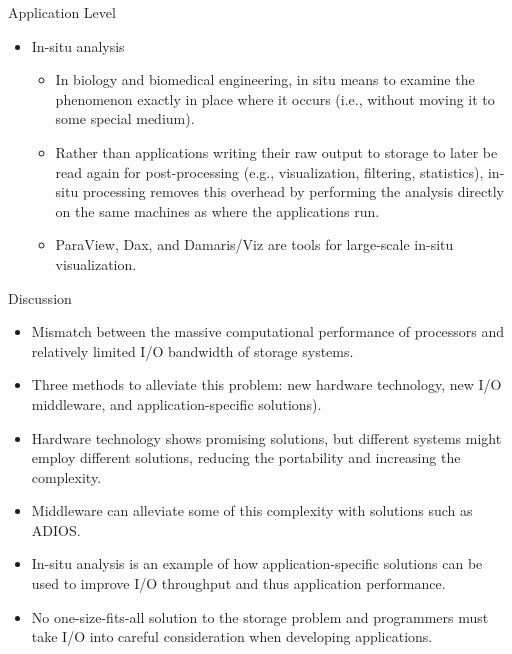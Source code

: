 \documentclass[compress,11pt,xcolor=svgnames,aspectratio=169]{beamer}
\begin{document}
\begin{frame}[t]{Application Level}

\begin{itemize}

\item In-situ analysis\\[0.4cm]

    \begin{itemize}
    \setlength\itemsep{0.6cm}

    \item In biology and biomedical engineering, in situ means to examine the phenomenon exactly in place where it occurs (i.e., without moving it to some special medium).

    \item Rather than applications writing their raw output to storage to later be read again for post-processing (e.g., visualization, filtering, statistics), in-situ processing removes this overhead by performing the analysis directly on the same machines as where the applications run.

    \item ParaView, Dax, and Damaris/Viz are tools for large-scale in-situ visualization.

    \end{itemize}

\end{itemize}

\end{frame}

\begin{frame}[t]{Discussion}

\begin{itemize}

\item Mismatch between the massive computational performance of processors and relatively limited I/O bandwidth of storage systems.

\item Three methods to alleviate this problem: new hardware technology, new I/O middleware, and application-specific solutions).

\item Hardware technology shows promising solutions, but different systems might employ different solutions, reducing the portability and increasing the complexity. %

\item Middleware can alleviate some of this complexity with solutions such as ADIOS.

\item In-situ analysis is an example of how application-specific solutions can be used to improve I/O throughput and thus application performance.

\item No one-size-fits-all solution to the storage problem and programmers must take I/O into careful consideration when developing applications.

\end{itemize}

\end{frame}
\end{document}

